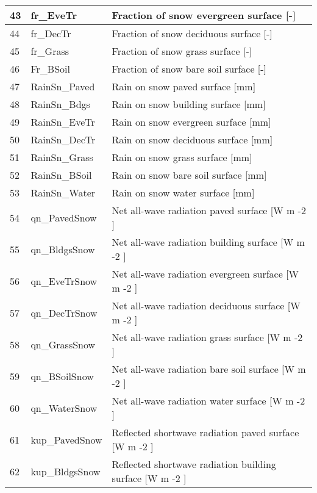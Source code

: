 \documentclass[letterpaper,10pt,english]{sphinxmanual}
\begin{document}
\begin{savenotes}
\begin{longtable}{|l|l|l|}
\\
\hline
43
&
fr\_EveTr
&
Fraction of snow \textendash{} evergreen surface {[}-{]}
\\
\hline
44
&
fr\_DecTr
&
Fraction of snow \textendash{} deciduous surface {[}-{]}
\\
\hline
45
&
fr\_Grass
&
Fraction of snow \textendash{} grass surface {[}-{]}
\\
\hline
46
&
Fr\_BSoil
&
Fraction of snow \textendash{} bare soil surface {[}-{]}
\\
\hline
47
&
RainSn\_Paved
&
Rain on snow \textendash{} paved surface {[}mm{]}
\\
\hline
48
&
RainSn\_Bdgs
&
Rain on snow \textendash{} building surface {[}mm{]}
\\
\hline
49
&
RainSn\_EveTr
&
Rain on snow \textendash{} evergreen surface {[}mm{]}
\\
\hline
50
&
RainSn\_DecTr
&
Rain on snow \textendash{} deciduous surface {[}mm{]}
\\
\hline
51
&
RainSn\_Grass
&
Rain on snow \textendash{} grass surface {[}mm{]}
\\
\hline
52
&
RainSn\_BSoil
&
Rain on snow \textendash{} bare soil surface {[}mm{]}
\\
\hline
53
&
RainSn\_Water
&
Rain on snow \textendash{} water surface {[}mm{]}
\\
\hline
54
&
qn\_PavedSnow
&
Net all-wave radiation \textendash{} paved surface {[}W m -2 {]}
\\
\hline
55
&
qn\_BldgsSnow
&
Net all-wave radiation \textendash{} building surface {[}W m -2 {]}
\\
\hline
56
&
qn\_EveTrSnow
&
Net all-wave radiation \textendash{} evergreen surface {[}W m -2 {]}
\\
\hline
57
&
qn\_DecTrSnow
&
Net all-wave radiation \textendash{} deciduous surface {[}W m -2 {]}
\\
\hline
58
&
qn\_GrassSnow
&
Net all-wave radiation \textendash{} grass surface {[}W m -2 {]}
\\
\hline
59
&
qn\_BSoilSnow
&
Net all-wave radiation \textendash{} bare soil surface {[}W m -2 {]}
\\
\hline
60
&
qn\_WaterSnow
&
Net all-wave radiation \textendash{} water surface {[}W m -2 {]}
\\
\hline
61
&
kup\_PavedSnow
&
Reflected shortwave radiation \textendash{} paved surface {[}W m -2 {]}
\\
\hline
62
&
kup\_BldgsSnow
&
Reflected shortwave radiation \textendash{} building surface {[}W m -2 {]}

\end{longtable}
\end{savenotes}
\end{document}
